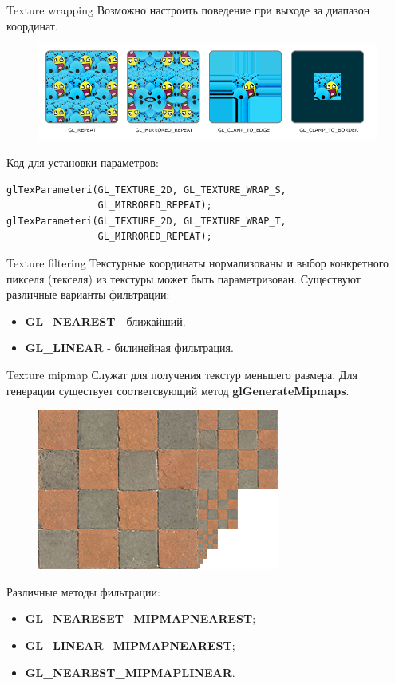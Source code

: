 \documentclass[aspectration=1610,t]{beamer}
\begin{document}
\begin{frame}[fragile]{Texture wrapping}
    Возможно настроить поведение при выходе за диапазон координат.
    \begin{figure}[htp]
        \centering
        \includegraphics[scale=0.40]{res/tex_wrap}
    \end{figure}

    Код для установки параметров:
    {\small \begin{lstlisting}
glTexParameteri(GL_TEXTURE_2D, GL_TEXTURE_WRAP_S,
                GL_MIRRORED_REPEAT);
glTexParameteri(GL_TEXTURE_2D, GL_TEXTURE_WRAP_T,
                GL_MIRRORED_REPEAT);
    \end{lstlisting}}
\end{frame}

\begin{frame}[fragile]{Texture filtering}
    Текстурные координаты нормализованы и выбор конкретного пикселя (текселя) из текстуры может быть параметризован.
    Существуют различные варианты фильтрации:
    \begin{itemize}
        \item {\bf GL\_NEAREST} - ближайший.
        \item {\bf GL\_LINEAR} - билинейная фильтрация.
    \end{itemize}
\end{frame}

\begin{frame}[fragile]{Texture mipmap}
    Служат для получения текстур меньшего размера. Для генерации существует соответсвующий метод {\bf glGenerateMipmaps}.
    \begin{figure}[htp]
        \centering
        \includegraphics[scale=0.40]{res/tex_mip}
    \end{figure}
    Различные методы фильтрации:
    \begin{itemize}
        \item {\bf GL\_NEARESET\_MIPMAPNEAREST};
        \item {\bf GL\_LINEAR\_MIPMAPNEAREST};
        \item {\bf GL\_NEAREST\_MIPMAPLINEAR}.
    \end{itemize}
\end{frame}
\end{document}
